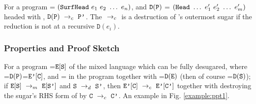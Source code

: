 \begin{Def}
	For a program  = $(\mbox{\tt SurfHead}~e_1~e_2~\ldots~e_n)$,
	and $\mathtt{D}(\mbox{\tt P})$ = $(\mbox{\tt Head}~\ldots~e_1'~e_2'~\ldots~e_m')$ headed with ,
	$\mathtt{D}(\mbox{\tt P}) ~\rightarrow_c~\mbox{\tt P'}$.
	The $~\rightarrow_c~$ is a destruction of 's outermost sugar if the reduction is not at a recursive $\mathtt{D}(e_i)$.
\end{Def}
\todo{}

\subsubsection{Properties and Proof Sketch}

\begin{property} \label{thm1}
	For a program =$\mbox{\tt E}[\mbox{\tt S}]$ of the mixed language which can be fully desugared, where =$\mathtt{D}(\mbox{\tt P})$=$\mbox{\tt E'}[\mbox{\tt C}]$, and = in the program  together with =$\mathtt{D}(\mbox{\tt E})$ (then of course =$\mathtt{D}(\mbox{\tt S})$); if $\mbox{\tt E}[\mbox{\tt S}] ~\rightarrow_m~\mbox{\tt E}[\mbox{\tt S'}]$ and $\mbox{\tt S} ~\rightarrow_d~ \mbox{\tt S'}$, then $\mbox{\tt E'}[\mbox{\tt C}] ~\rightarrow_c~\mbox{\tt E'}[\mbox{\tt C'}]$ together with destroying the sugar's RHS form of  by $\mbox{\tt C} ~\rightarrow_c~\mbox{\tt C'}$. An example in Fig. \ref{example:ppt1}.
\end{property}

